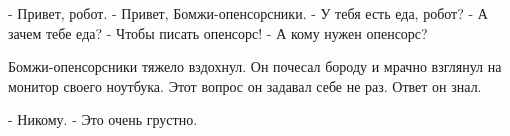 - Привет, робот.
- Привет, Бомжи-опенсорсники.
- У тебя есть еда, робот?
- А зачем тебе еда?
- Чтобы писать опенсорс!
- А кому нужен опенсорс?

Бомжи-опенсорсники тяжело вздохнул. Он почесал бороду и мрачно взглянул на монитор своего ноутбука. Этот вопрос он задавал себе не раз. Ответ он знал.

- Никому.
- Это очень грустно.